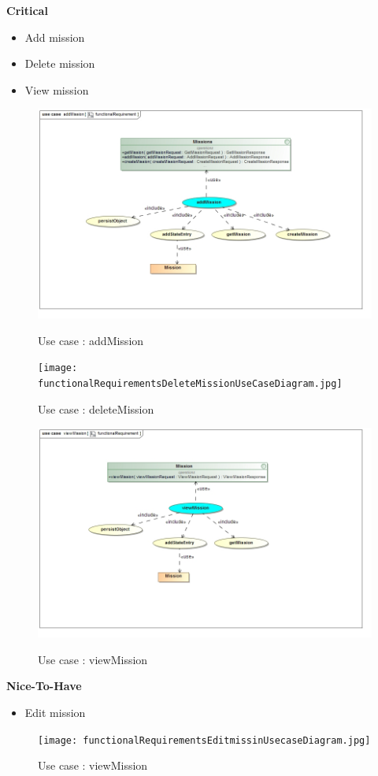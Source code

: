 \documentclass{article}
\begin{document}
		\begin{flushleft}
			\textbf{Critical}
				\begin{itemize}
	  				\item Add mission
	  				\item Delete mission
	  				\item View mission
				\end{itemize}
				
				\begin{figure}[H]
					\includegraphics[width=\textwidth]{functionalRequirement_addmission.jpg}  \\
					\caption{Use case : addMission}
				\end{figure}
				
				\begin{figure}[H]
					\texttt{[image: functionalRequirementsDeleteMissionUseCaseDiagram.jpg]}  \\
					\caption{Use case : deleteMission}
				\end{figure}
				
				\begin{figure}[H]
					\includegraphics[width=\textwidth]{functionalRequirement_viewmission.jpg}  \\
					\caption{Use case : viewMission}
				\end{figure}

			\textbf{Nice-To-Have}
				\begin{itemize}
	  				\item Edit mission
				\end{itemize}
				
				\begin{figure}[H]
					\texttt{[image: functionalRequirementsEditmissinUsecaseDiagram.jpg]}  \\
					\caption{Use case : viewMission}
				\end{figure}
		\end{flushleft}
\end{document}
